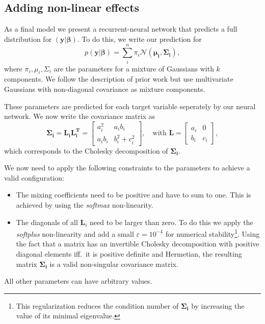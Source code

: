 \documentclass[nobib]{tufte-handout}
\begin{document}
\subsection{Adding non-linear effects}
As a final model we present a recurrent-neural network that predicts a full distribution for \(\left( \bm{y} | \bm{\beta} \right)\).
To do this, we write our prediction for
\begin{equation*}
p \left( \bm{y} | \bm{\beta} \right) = \sum_{i}^n \pi_i \mathcal{N} \left( \bm{\mu_i}, \bm{\Sigma_i} \right),
\end{equation*}
where \(\pi_i, \mu_i, \Sigma_i\) are the parameters for a mixture of Gaussians with \(k\) components.
We follow the description of prior work\autocite{mdn} but use multivariate Gaussians with non-diagonal covariance as mixture components.

These parameters are predicted for each target variable seperately by our neural network.
We now write the covariance matrix as
\begin{equation*}
  \bm{\Sigma_i} = \bm{L_i} \bm{L_i^T} =
  \begin{bmatrix}
    a_i^2 & a_ib_i \\
    a_ib_i & b_i^2 + c_i^2
  \end{bmatrix} ,\quad
   \text{with } \bm{L} =
   \begin{bmatrix}
     a_i & 0 \\
     b_i & c_i
   \end{bmatrix},
\end{equation*}
which corresponds to the Cholesky decomposition of \(\bm{\Sigma_i}\).

We now need to apply the following constraints to the parameters to achieve a valid configuration:
\begin{itemize}
\item The mixing coefficients need to be positive and have to sum to one.
  This is achieved by using the \textit{softmax} non-linearity.
\item The diagonals of all \(\bm{L}_i\) need to be larger than zero.
  To do this we apply the \textit{softplus} non-linearity and add a small \(\varepsilon = 10^{-4}\) for numerical stability\footnote{This regularization reduces the condition number of \(\bm{\Sigma_i}\) by increasing the value of its minimal eigenvalue.}. %
  Using the fact that a matrix has an invertible Cholesky decomposition with positive diagonal elements iff.\ it is positive definite and Hermetian,
  the resulting matrix \(\bm{\Sigma_i}\) is a valid non-singular covariance matrix.
\end{itemize}
All other parameters can have arbitrary values.
\end{document}
